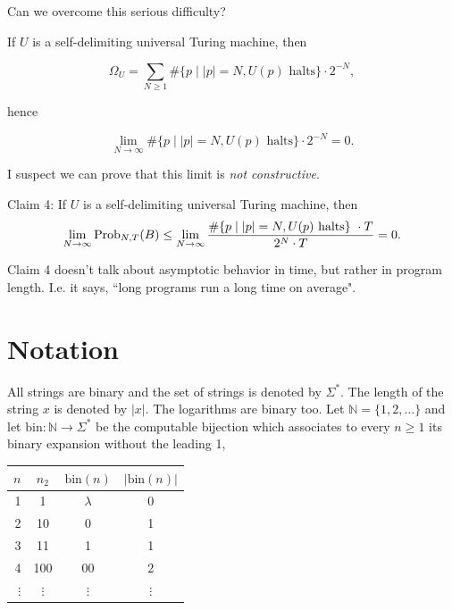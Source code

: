 \documentclass[12pt,twoside,openright]{report}
\newcommand{\NN}{\mathbb{N}}
\newcommand{\ctr}[1]{\begin{center} #1 \end{center}}
\newcommand{\bin}{\mbox{bin}}
\newcommand{\Prob}{{\rm Prob}}
\begin{document}
Can we overcome this serious difficulty?

\medskip

If $U$ is a self-delimiting universal Turing machine, then

\[\Omega_{U} = \sum_{N\ge 1} \#\{ p \mid |p|=N, U(p) \mbox{  halts}\}\cdot 2^{-N},\]

\noindent hence

\[\lim_{N \rightarrow \infty}   \#\{ p \mid |p|=N, U(p) \mbox{  halts}\}\cdot 2^{-N}=0.\]

I suspect we can prove that this limit is {\it not constructive}.

\medskip

Claim 4:   If $U$ is a self-delimiting universal Turing machine, then $$\lim_{N \rightarrow \infty}\Prob_{N,T}(B) \le \lim_{N \rightarrow \infty}
\frac{ \#\{ p \mid |p|=N, U(p) \mbox{  halts}\}\ \cdot T}{2^{N} \cdot T} =0.$$


Claim 4 doesn't talk about asymptotic behavior in time, but rather in program length.  I.e. it says,  ``long programs run a long time on average".
\fi
 
 
 
 


\section{Notation}

All strings are binary and the set of strings is denoted by $\Sigma^{*}$.  The length of the string $x$ is denoted by $|x|$. The logarithms are binary too.  Let $\NN = \{1,2,\ldots\}$ and let $\bin:\NN \rightarrow \Sigma^*$ be the computable bijection which associates to every $n\ge 1$ its binary expansion without the leading 1,  
\ctr{\begin{tabular}{r|c|c|c}
$n$&$n_2$&$\bin(n)$& $|\bin(n)|$\\
\hline
1&1&$\lambda$ & 0\\
2&10&0 & 1\\
3&11&1& 1\\
4&100&00 & 2\\
$\vdots$&$\vdots$&$\vdots$&$\vdots$
\end{tabular}}
\end{document}
